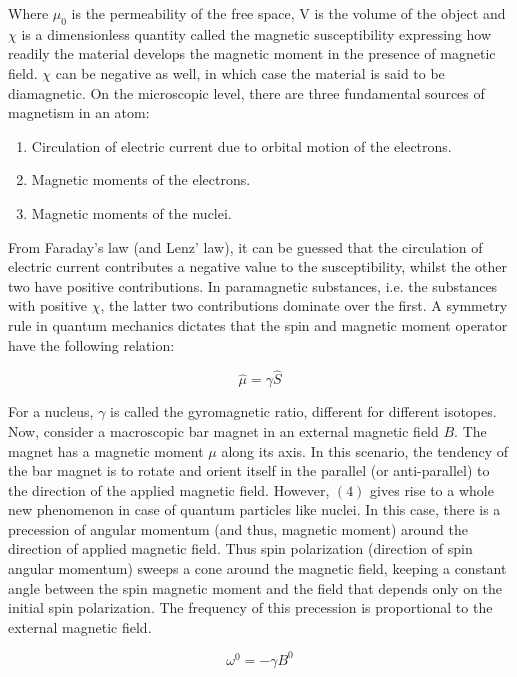 		Where $\mu_{0}$ is the permeability of the free space, V is the volume
		of the object and $\chi$ is a dimensionless quantity called the magnetic
		susceptibility expressing how readily the material develops the magnetic
		moment in the presence of magnetic field. $\chi$ can be negative
		as well, in which case the material is said to be diamagnetic. On
		the microscopic level, there are three fundamental sources of magnetism
		in an atom:
		\begin{enumerate}
		\item Circulation of electric current due to orbital motion of the electrons.
		\item Magnetic moments of the electrons.
		\item Magnetic moments of the nuclei.
		\end{enumerate}
		From Faraday's law (and Lenz' law), it can be guessed that the circulation
		of electric current contributes a negative value to the susceptibility,
		whilst the other two have positive contributions. In paramagnetic
		substances, i.e. the substances with positive $\chi$, the latter
		two contributions dominate over the first. A symmetry rule in quantum
		mechanics dictates that the spin and magnetic moment operator have
		the following relation:

		\begin{equation}
		\hat{\mu}=\gamma\hat{S}
		\end{equation}


		For a nucleus, $\gamma$ is called the gyromagnetic ratio, different
		for different isotopes. Now, consider a macroscopic bar magnet in
		an external magnetic field $B.$ The magnet has a magnetic moment
		$\mu$ along its axis. In this scenario, the tendency of the bar magnet
		is to rotate and orient itself in the parallel (or anti-parallel)
		to the direction of the applied magnetic field. However, $(4)$ gives
		rise to a whole new phenomenon in case of quantum particles like nuclei.
		In this case, there is a precession of angular momentum (and thus,
		magnetic moment) around the direction of applied magnetic field. Thus
		spin polarization (direction of spin angular momentum) sweeps a cone
		around the magnetic field, keeping a constant angle between the spin
		magnetic moment and the field that depends only on the initial spin
		polarization. The frequency of this precession is proportional to
		the external magnetic field. 

		\begin{equation}
		\omega^{0}=-\gamma B^{0}
		\end{equation}


